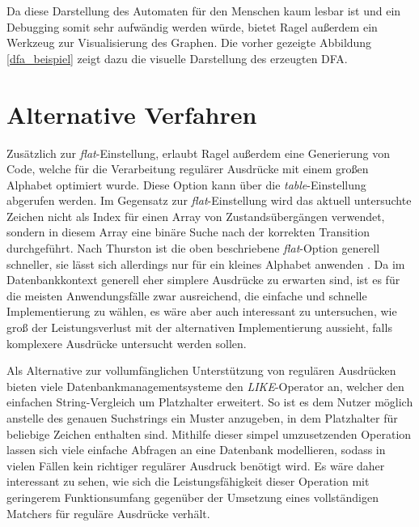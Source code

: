 Da diese Darstellung des Automaten für den Menschen kaum lesbar ist und ein Debugging somit sehr aufwändig werden würde, bietet Ragel außerdem ein Werkzeug zur Visualisierung des Graphen.
Die vorher gezeigte Abbildung \ref{dfa_beispiel} zeigt dazu die visuelle Darstellung des erzeugten DFA.

\section{Alternative Verfahren}
\label{sec:regex_alternativen}

Zusätzlich zur \emph{flat}-Einstellung, erlaubt Ragel außerdem eine Generierung von Code, welche für die Verarbeitung regulärer Ausdrücke mit einem großen Alphabet optimiert wurde.
Diese Option kann über die \emph{table}-Einstellung abgerufen werden.
Im Gegensatz zur \emph{flat}-Einstellung wird das aktuell untersuchte Zeichen nicht als Index für einen Array von Zustandsübergängen verwendet, sondern in diesem Array eine binäre Suche nach der korrekten Transition durchgeführt.
Nach Thurston ist die oben beschriebene \emph{flat}-Option generell schneller, sie lässt sich allerdings nur für ein kleines Alphabet anwenden \cite{Thurston2009}.
Da im Datenbankkontext generell eher simplere Ausdrücke zu erwarten sind, ist es für die meisten Anwendungsfälle zwar ausreichend, die einfache und schnelle Implementierung zu wählen, es wäre aber auch interessant zu untersuchen, wie groß der Leistungsverlust mit der alternativen Implementierung aussieht, falls komplexere Ausdrücke untersucht werden sollen.

Als Alternative zur vollumfänglichen Unterstützung von regulären Ausdrücken bieten viele Datenbankmanagementsysteme den \emph{LIKE}-Operator an, welcher den einfachen String-Vergleich um Platzhalter erweitert.
So ist es dem Nutzer möglich anstelle des genauen Suchstrings ein Muster anzugeben, in dem Platzhalter für beliebige Zeichen enthalten sind.
Mithilfe dieser simpel umzusetzenden Operation lassen sich viele einfache Abfragen an eine Datenbank modellieren, sodass in vielen Fällen kein richtiger regulärer Ausdruck benötigt wird.
Es wäre daher interessant zu sehen, wie sich die Leistungsfähigkeit dieser Operation mit geringerem Funktionsumfang gegenüber der Umsetzung eines vollständigen Matchers für reguläre Ausdrücke verhält.